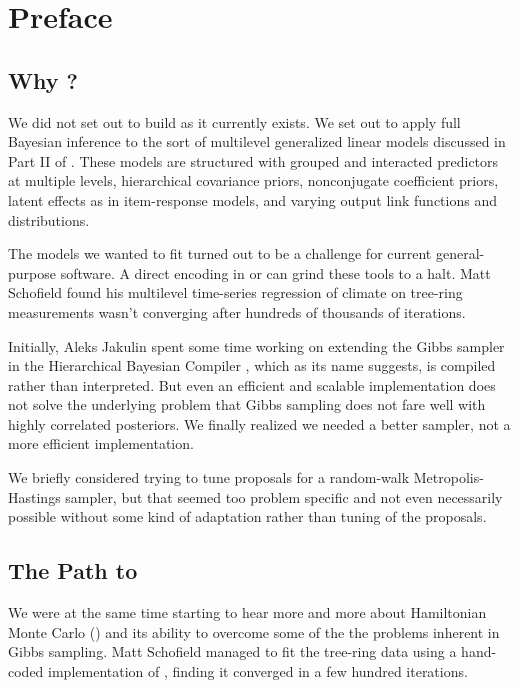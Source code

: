 \chapter*{Preface}

\section*{Why \Stan?}

We did not set out to build \Stan as it currently exists.  We set out to
apply full Bayesian inference to the sort of multilevel generalized
linear models discussed in Part II of \citep{GelmanHill:2007}.  These
models are structured with grouped and interacted predictors at
multiple levels, hierarchical covariance priors, nonconjugate
coefficient priors, latent effects as in item-response models, and
varying output link functions and distributions.

The models we wanted to fit turned out to be a challenge for current
general-purpose software.  A direct encoding in \BUGS or \JAGS can
grind these tools to a halt.  Matt Schofield found his multilevel
time-series regression of climate on tree-ring measurements wasn't
converging after hundreds of thousands of iterations.

Initially, Aleks Jakulin spent some time working on extending the
Gibbs sampler in the Hierarchical Bayesian Compiler
\citep{DaumeIII:2007}, which as its name suggests, is compiled rather
than interpreted.  But even an efficient and scalable implementation
does not solve the underlying problem that Gibbs sampling does not
fare well with highly correlated posteriors.  We finally realized we
needed a better sampler, not a more efficient implementation.

We briefly considered trying to tune proposals for a random-walk
Metropolis-Hastings sampler, but that seemed too problem specific and
not even necessarily possible without some kind of adaptation rather
than tuning of the proposals. 
 

\section*{The Path to \Stan}

We were at the same time starting to hear more and more about
Hamiltonian Monte Carlo (\HMC) and its ability to overcome some of the
the problems inherent in Gibbs sampling.  Matt Schofield managed to
fit the tree-ring data using a hand-coded implementation of \HMC,
finding it converged in a few hundred iterations.

